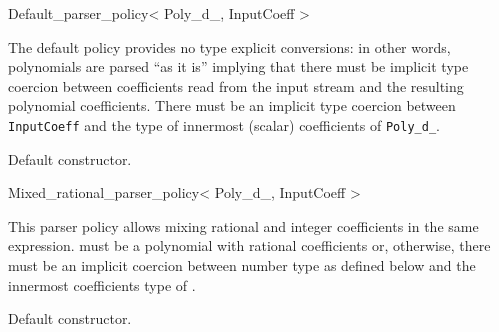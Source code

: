 \begin{ccRefClass} {Default_parser_policy< Poly_d_, InputCoeff >}

\ccDefinition
The default policy provides no type explicit conversions: in other words, polynomials are parsed ``as it is'' implying that there must be implicit type coercion between coefficients read from the input stream and the resulting polynomial coefficients. There must be an implicit type coercion between {\tt InputCoeff} and the type of innermost (scalar) coefficients of {\tt Poly\_d\_}.


\ccIsModel
{}

\ccTypes

\ccGlue
{}\ccGlue


\ccCreation
{}

{Default constructor.}

\end{ccRefClass}

\begin{ccRefClass} {Mixed_rational_parser_policy< Poly_d_, InputCoeff >}

\ccDefinition
This parser policy allows mixing rational and integer coefficients in the same expression.  must be a polynomial with rational coefficients or, otherwise, there must be an implicit coercion between  number type as defined below and
the innermost coefficients type of . 


\ccIsModel
{}

\ccInheritsFrom
{}

\ccTypes

\ccGlue
{}\ccGlue
{}\ccGlue
{}\ccGlue


\ccCreation
{}

{Default constructor.}

\end{ccRefClass}

